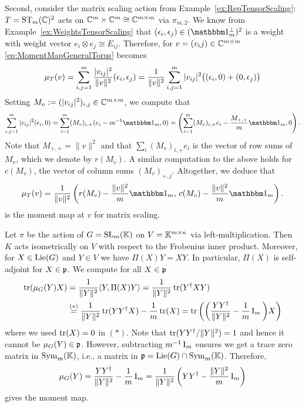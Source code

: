 \begin{example}
	Second, consider the matrix scaling action from Example~\ref{ex:RepTensorScaling}: $T = \operatorname{ST}_m(\mathbb C)^2$ acts on $\mathbb C^m \times \mathbb C^m \cong \mathbb C^{m \times m}$ via $\pi_{m,2}$. We know from Example~\ref{ex:WeightsTensorScaling} that $(\eps_i,\eps_j) \in (\onePerp)^2$ is a weight with weight vector $e_i \otimes e_j \cong E_{ij}$. Therefore, for $v = (v_ij) \in \mathbb C^{m \times m}$ \eqref{eq:MomentMapGeneralTorus} becomes
		\[ \mu_T(v) = \sum_{i,j=1}^m \frac{|v_{ij}|^2}{\|v\|^2} (\epsilon_i, \epsilon_j) = \frac{1}{\|v\|^2} \sum_{i,j=1}^m |v_{ij}|^2 \big( (\epsilon_i,0) + (0, \epsilon_j) \big)  \]
	Setting $M_v := (|v_{ij}|^2)_{i,j} \in \mathbb C^{m \times m}$, we compute that
		\begin{align*}
			\sum_{i,j=1}^m |v_{ij}|^2 (\eps_i,0) = \sum_{i=1}^m (M_v)_{i,+} (e_i - m^{-1} \ones_m, 0)
			= \left( \sum_{i=1}^m (M_v)_{i,+}e_i - \frac{M_{+,+}}{m} \ones_m, 0 \right) .
		\end{align*}
	Note that $M_{+,+} = \|v\|^2$ and that $\sum_i (M_v)_{i,+}e_i$ is the vector of row sums of $M_v$, which we denote by $r(M_v)$. A similar computation to the above holds for $c(M_v)$, the vector of column sums $(M_v)_{+,j}$. Altogether, we deduce that
	\begin{equation}\label{eq:MatrixScalingMomentmap}
		\mu_T(v) = \frac{1}{\|v\|^2} \left( r(M_v) - \frac{\|v\|^2}{m} \ones_m, \, c(M_v) - \frac{\|v\|^2}{m} \ones_m \right).
	\end{equation}
	is  the moment map at $v$ for matrix scaling.
	\hfill\exSymbol
\end{example}

\begin{example} \label{ex:MomentMapLeftMult}
	Let $\pi$ be the action of $G = \operatorname{SL}_m(\mathbb K)$ on $V = \mathbb K^{m \times n}$ via left-multiplication. Then $K$ acts isometrically on $V$ with respect to the Frobenius inner product. Moreover, for $X \in \operatorname{Lie}(G)$ and $Y \in V$ we have $\Pi(X)Y = XY$. In particular, $\Pi(X)$ is self-adjoint for $X \in \mathfrak{p}$. We compute for all $X \in \mathfrak{p}$
		\begin{align*}
			\operatorname{tr} ( \mu_G(Y) X ) &= \frac{1}{\|Y\|^2} \langle Y, \Pi(X)Y \rangle = \frac{1}{\|Y\|^2} \operatorname{tr}( Y^{\dagger} X Y) \\
			&\overset{(*)}{=} \frac{1}{\|Y\|^2} \operatorname{tr}( Y Y^{\dagger} X) - \frac{1}{m} \operatorname{tr}(X)	= \operatorname{tr} \left( \bigg(\frac{Y Y^{\dagger}}{\|Y\|^2} - \frac{1}{m} \operatorname{I}_m \bigg) X \right)
		\end{align*}
	where we used $\operatorname{tr}(X) = 0$ in $(*)$. Note that $\operatorname{tr}(YY^{\dagger} / \|Y\|^2) = 1$ and hence it cannot be $\mu_G(Y) \in \mathfrak{p}$. However, subtracting $m^{-1}\operatorname{I}_m$ ensures we get a trace zero matrix in $\operatorname{Sym}_m(\mathbb K)$, i.e., a matrix in $\mathfrak{p} = \operatorname{Lie}(G) \cap \operatorname{Sym}_m(\mathbb K)$. Therefore,
		\begin{equation}\label{eq:LeftMultMomentMap}
			\mu_G(Y) = \frac{Y Y^{\dagger}}{\|Y\|^2} - \frac{1}{m} \operatorname{I}_m = \frac{1}{\| Y\|^2} \left( Y Y^{\dagger} - \frac{\|Y\|^2}{m} \operatorname{I}_m \right)
		\end{equation}
	gives the moment map.
	\hfill\exSymbol
\end{example}


